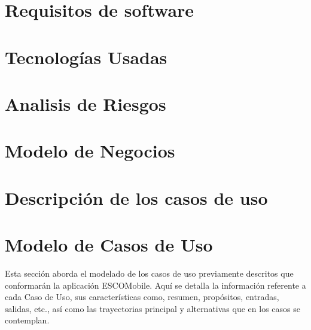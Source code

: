 \documentclass[oneside,10pt]{book}
\begin{document}
\chapter{Requisitos de software}


\chapter{Tecnologías Usadas}


\chapter{Analisis de Riesgos}


\chapter{Modelo de Negocios}


\chapter{Descripción de los casos de uso}

\chapter{Modelo de Casos de Uso}
\noindent
Esta sección aborda el modelado de los casos de uso previamente descritos que conformarán la aplicación ESCOMobile. Aquí se detalla la información referente a cada Caso de Uso, sus características como, resumen, propósitos, entradas, salidas, etc., así como las trayectorias principal y alternativas que en los casos se contemplan. 
\end{document}

